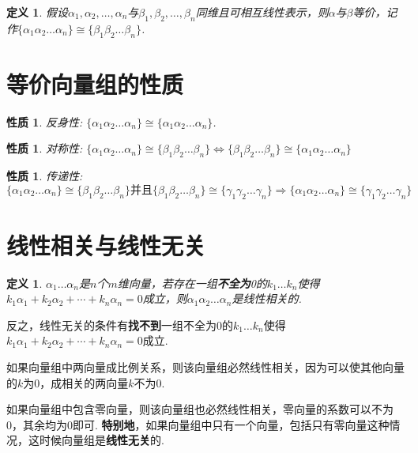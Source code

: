 \documentclass[12pt, a4paper, oneside]{ctexbook}
\newtheorem{definition}[theorem]{定义}
\newtheorem{quolity}[theorem]{性质}
\begin{document}
\begin{definition}
    假设$\alpha_1, \alpha_2, \dots, \alpha_n$与$\beta_1, \beta_2, \dots, \beta_n$同维且可相互线性表示，则$\alpha$与$\beta$等价，记作$\{\alpha_1 \alpha_2 \dots \alpha_n\} \cong \{\beta_1 \beta_2 \dots \beta_n\}$.
\end{definition}

\section{等价向量组的性质}

\begin{quolity}
    反身性: $\{\alpha_1 \alpha_2 \dots \alpha_n\} \cong \{\alpha_1 \alpha_2 \dots \alpha_n\}$.
\end{quolity}

\begin{quolity}
    对称性: $\{\alpha_1 \alpha_2 \dots \alpha_n\} \cong \{\beta_1 \beta_2 \dots \beta_n\} \Leftrightarrow \{\beta_1 \beta_2 \dots \beta_n\} \cong \{\alpha_1 \alpha_2 \dots \alpha_n\}$
\end{quolity}

\begin{quolity}
    传递性: $\{\alpha_1 \alpha_2 \dots \alpha_n\} \cong \{\beta_1 \beta_2 \dots \beta_n\} \mbox{并且} \{\beta_1 \beta_2 \dots \beta_n\} \cong \{\gamma_1 \gamma_2 \dots \gamma_n\} \Rightarrow \{\alpha_1 \alpha_2 \dots \alpha_n\} \cong \{\gamma_1 \gamma_2 \dots \gamma_n\}$
\end{quolity}

\section{线性相关与线性无关}

\begin{definition}
    $\alpha_1 \dots \alpha_n$是$n$个$m$维向量，若存在一组\textbf{不全为}0的$k_1 \dots k_n$使得$k_1\alpha_1 + k_2\alpha_2 + \cdots + k_n\alpha_n = 0$成立，则$\alpha_1 \alpha_2 \dots \alpha_n$是线性相关的. 
\end{definition}

反之，线性无关的条件有\textbf{找不到}一组不全为0的$k_1 \dots k_n$使得$k_1\alpha_1 + k_2\alpha_2 + \cdots + k_n\alpha_n = 0$成立. 


如果向量组中两向量成比例关系，则该向量组必然线性相关，因为可以使其他向量的$k$为0，成相关的两向量$k$不为0. 


如果向量组中包含零向量，则该向量组也必然线性相关，零向量的系数可以不为0，其余均为0即可. \textbf{特别地}，如果向量组中只有一个向量，包括只有零向量这种情况，这时候向量组是\textbf{线性无关}的. 
\end{document}
